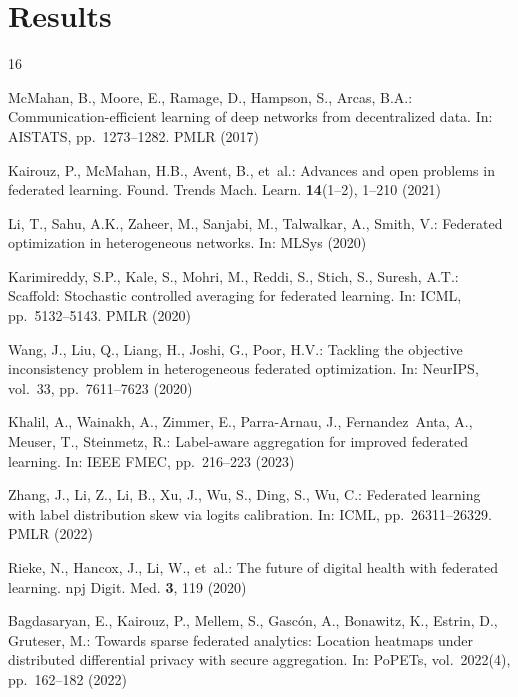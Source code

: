 \documentclass[runningheads]{llncs}
\begin{document}
\section{Results}


%
%
%
% 
% 
%
\begin{thebibliography}{16}

McMahan, B., Moore, E., Ramage, D., Hampson, S., Arcas, B.A.: Communication-efficient learning of deep networks from decentralized data. In: AISTATS, pp.~1273--1282. PMLR (2017)

Kairouz, P., McMahan, H.B., Avent, B., et~al.: Advances and open problems in federated learning. Found. Trends Mach. Learn. \textbf{14}(1--2), 1--210 (2021)

Li, T., Sahu, A.K., Zaheer, M., Sanjabi, M., Talwalkar, A., Smith, V.: Federated optimization in heterogeneous networks. In: MLSys (2020)

Karimireddy, S.P., Kale, S., Mohri, M., Reddi, S., Stich, S., Suresh, A.T.: Scaffold: Stochastic controlled averaging for federated learning. In: ICML, pp.~5132--5143. PMLR (2020)

Wang, J., Liu, Q., Liang, H., Joshi, G., Poor, H.V.: Tackling the objective inconsistency problem in heterogeneous federated optimization. In: NeurIPS, vol.~33, pp.~7611--7623 (2020)

Khalil, A., Wainakh, A., Zimmer, E., Parra-Arnau, J., Fernandez~Anta, A., Meuser, T., Steinmetz, R.: Label-aware aggregation for improved federated learning. In: IEEE FMEC, pp.~216--223 (2023)

Zhang, J., Li, Z., Li, B., Xu, J., Wu, S., Ding, S., Wu, C.: Federated learning with label distribution skew via logits calibration. In: ICML, pp.~26311--26329. PMLR (2022)

Rieke, N., Hancox, J., Li, W., et~al.: The future of digital health with federated learning. npj Digit. Med. \textbf{3}, 119 (2020)

Bagdasaryan, E., Kairouz, P., Mellem, S., Gasc\'{o}n, A., Bonawitz, K., Estrin, D., Gruteser, M.: Towards sparse federated analytics: Location heatmaps under distributed differential privacy with secure aggregation. In: PoPETs, vol.~2022(4), pp.~162--182 (2022)


\end{thebibliography}
\end{document}
